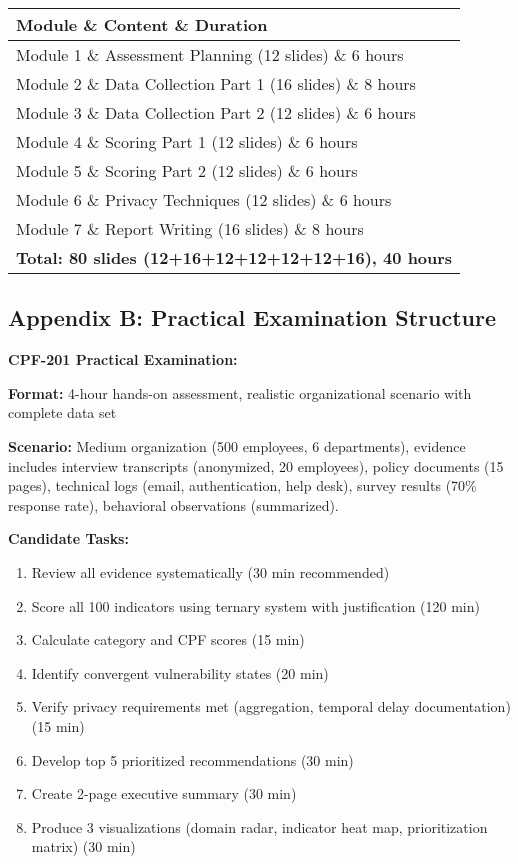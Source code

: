 \documentclass[11pt,a4paper]{article}
\begin{document}
\begin{longtable}{|l|l|l|}
\hline
\textbf{Module} \& \textbf{Content} \& \textbf{Duration} \\
\hline
\endhead

Module 1 \& Assessment Planning (12 slides) \& 6 hours \\
Module 2 \& Data Collection Part 1 (16 slides) \& 8 hours \\
Module 3 \& Data Collection Part 2 (12 slides) \& 6 hours \\
Module 4 \& Scoring Part 1 (12 slides) \& 6 hours \\
Module 5 \& Scoring Part 2 (12 slides) \& 6 hours \\
Module 6 \& Privacy Techniques (12 slides) \& 6 hours \\
Module 7 \& Report Writing (16 slides) \& 8 hours \\
\hline

\multicolumn{3}{|c|}{\textbf{Total: 80 slides (12+16+12+12+12+12+16), 40 hours}} \\
\hline

\end{longtable}

\subsection{Appendix B: Practical Examination Structure}

\textbf{CPF-201 Practical Examination:}

\textbf{Format:} 4-hour hands-on assessment, realistic organizational scenario with complete data set

\textbf{Scenario:} Medium organization (500 employees, 6 departments), evidence includes interview transcripts (anonymized, 20 employees), policy documents (15 pages), technical logs (email, authentication, help desk), survey results (70\% response rate), behavioral observations (summarized).

\textbf{Candidate Tasks:}
\begin{enumerate}
\item Review all evidence systematically (30 min recommended)
\item Score all 100 indicators using ternary system with justification (120 min)
\item Calculate category and CPF scores (15 min)
\item Identify convergent vulnerability states (20 min)
\item Verify privacy requirements met (aggregation, temporal delay documentation) (15 min)
\item Develop top 5 prioritized recommendations (30 min)
\item Create 2-page executive summary (30 min)
\item Produce 3 visualizations (domain radar, indicator heat map, prioritization matrix) (30 min)
\end{enumerate}
\end{document}

